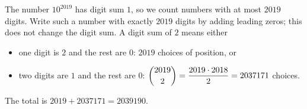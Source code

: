 The number $10^{2019}$ has digit sum $1$, so we count numbers with at most $2019$ digits. Write such a number with exactly $2019$ digits by adding leading zeros; this does not change the digit sum. A digit sum of $2$ means either
\begin{itemize}
\item one digit is $2$ and the rest are $0$: $2019$ choices of position, or
\item two digits are $1$ and the rest are $0$: $\dbinom{2019}{2}=\dfrac{2019\cdot2018}{2}=2037171$ choices.
\end{itemize}
The total is $2019+2037171=\boxed{2039190}$.

